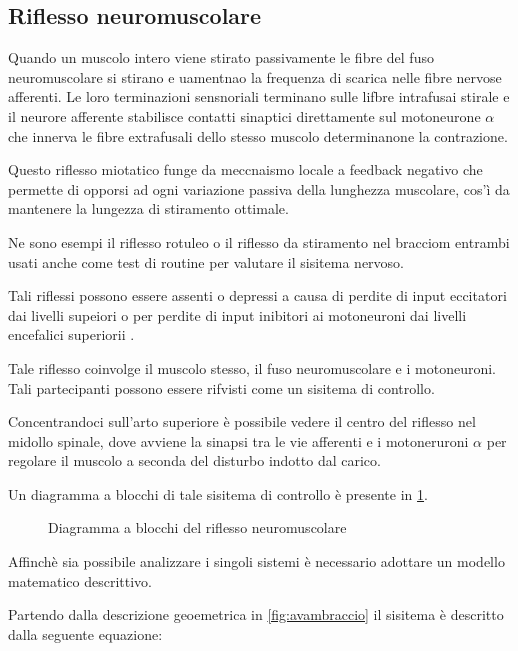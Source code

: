 \subsection{Riflesso neuromuscolare}

Quando un muscolo intero viene stirato passivamente le fibre del fuso neuromuscolare si stirano e uamentnao la frequenza di scarica nelle fibre nervose afferenti. Le loro terminazioni sensnoriali terminano sulle lifbre intrafusai stirale e il neurore afferente stabilisce contatti sinaptici direttamente sul motoneurone $\alpha$ che innerva le fibre extrafusali dello stesso muscolo determinanone la contrazione. 

Questo riflesso miotatico funge da meccnaismo locale a feedback negativo che permette di opporsi ad ogni variazione passiva della lunghezza muscolare, cos'ì da mantenere la lungezza di stiramento ottimale. 

Ne sono esempi il riflesso rotuleo o il riflesso da stiramento nel bracciom entrambi usati anche come test di routine per valutare il sisitema nervoso. 

Tali riflessi possono essere assenti o depressi a causa di perdite di input eccitatori dai livelli supeiori o per perdite di input inibitori ai motoneuroni dai livelli encefalici superiorii \cite{sherwood_fisiologia_2008}.

Tale riflesso coinvolge il muscolo stesso, il fuso neuromuscolare e i motoneuroni. Tali partecipanti possono essere rifvisti come un sisitema di controllo. 

Concentrandoci sull'arto superiore è possibile vedere il centro del riflesso nel midollo spinale, dove avviene la sinapsi tra le vie afferenti e i motoneruroni $\alpha$ per regolare il muscolo a seconda del disturbo indotto dal carico.

Un diagramma a blocchi di tale sisitema di controllo è presente in \cref{fig:sistemamuscolo}.

\begin{figure}[t!]
	\centering
	\footnotesize{\def\svgwidth{0.95\linewidth}
	}
	\caption{Diagramma a blocchi del riflesso neuromuscolare}
	\label{fig:sistemamuscolo}
\end{figure}

Affinchè sia possibile analizzare i singoli sistemi è necessario adottare un modello matematico descrittivo.

Partendo dalla descrizione geoemetrica in \cref{fig:avambraccio} il sisitema è descritto dalla seguente equazione:

